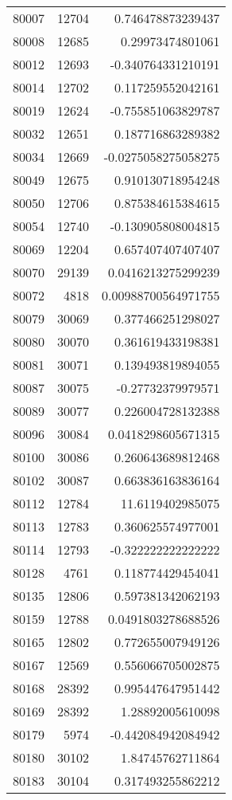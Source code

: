\begin{tabular}{r | r | r}
80007 & 12704 & 0.746478873239437 \\
80008 & 12685 & 0.29973474801061 \\
80012 & 12693 & -0.340764331210191 \\
80014 & 12702 & 0.117259552042161 \\
80019 & 12624 & -0.755851063829787 \\
80032 & 12651 & 0.187716863289382 \\
80034 & 12669 & -0.0275058275058275 \\
80049 & 12675 & 0.910130718954248 \\
80050 & 12706 & 0.875384615384615 \\
80054 & 12740 & -0.130905808004815 \\
80069 & 12204 & 0.657407407407407 \\
80070 & 29139 & 0.0416213275299239 \\
80072 & 4818 & 0.00988700564971755 \\
80079 & 30069 & 0.377466251298027 \\
80080 & 30070 & 0.361619433198381 \\
80081 & 30071 & 0.139493819894055 \\
80087 & 30075 & -0.27732379979571 \\
80089 & 30077 & 0.226004728132388 \\
80096 & 30084 & 0.0418298605671315 \\
80100 & 30086 & 0.260643689812468 \\
80102 & 30087 & 0.663836163836164 \\
80112 & 12784 & 11.6119402985075 \\
80113 & 12783 & 0.360625574977001 \\
80114 & 12793 & -0.322222222222222 \\
80128 & 4761 & 0.118774429454041 \\
80135 & 12806 & 0.597381342062193 \\
80159 & 12788 & 0.0491803278688526 \\
80165 & 12802 & 0.772655007949126 \\
80167 & 12569 & 0.556066705002875 \\
80168 & 28392 & 0.995447647951442 \\
80169 & 28392 & 1.28892005610098 \\
80179 & 5974 & -0.442084942084942 \\
80180 & 30102 & 1.84745762711864 \\
80183 & 30104 & 0.317493255862212 \\

\end{tabular}
